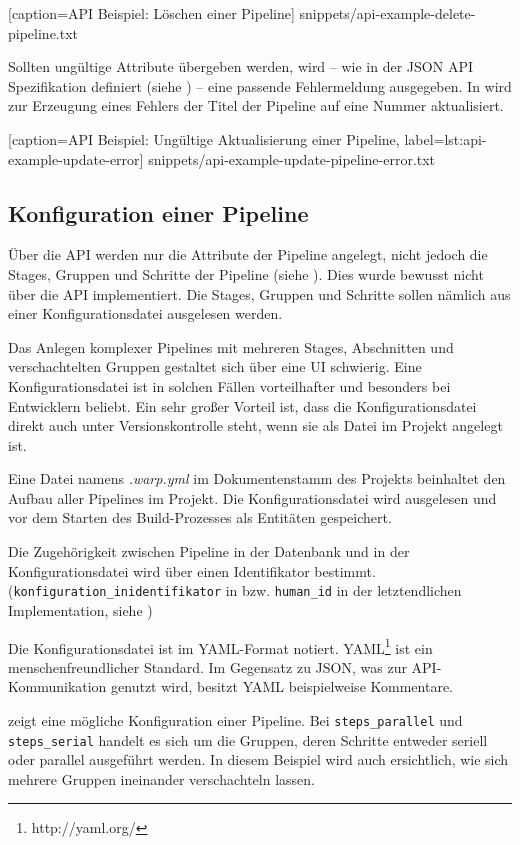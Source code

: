 
  [caption={API Beispiel: Löschen einer Pipeline}]
  {snippets/api-example-delete-pipeline.txt}

Sollten ungültige Attribute übergeben werden, wird – wie in der JSON API Spezifikation definiert (siehe ) – eine passende Fehlermeldung ausgegeben. In  wird zur Erzeugung eines Fehlers der Titel der Pipeline auf eine Nummer aktualisiert.


  [caption={API Beispiel: Ungültige Aktualisierung einer Pipeline},
  label={lst:api-example-update-error}]
  {snippets/api-example-update-pipeline-error.txt}


\subsection{Konfiguration einer Pipeline}

Über die API werden nur die Attribute der Pipeline angelegt, nicht jedoch die Stages, Gruppen und Schritte der Pipeline (siehe ). Dies wurde bewusst nicht über die API implementiert. Die Stages, Gruppen und Schritte sollen nämlich aus einer Konfigurationsdatei ausgelesen werden.

Das Anlegen komplexer Pipelines mit mehreren Stages, Abschnitten und verschachtelten Gruppen gestaltet sich über eine UI schwierig. Eine Konfigurationsdatei ist in solchen Fällen vorteilhafter und besonders bei Entwicklern beliebt. Ein sehr großer Vorteil ist, dass die Konfigurationsdatei direkt auch unter Versionskontrolle steht, wenn sie als Datei im Projekt angelegt ist.

Eine Datei namens \emph{.warp.yml} im Dokumentenstamm des Projekts beinhaltet den Aufbau aller Pipelines im Projekt. Die Konfigurationsdatei wird ausgelesen und vor dem Starten des Build-Prozesses als Entitäten gespeichert.

Die Zugehörigkeit zwischen Pipeline in der Datenbank und in der Konfigurationsdatei wird über einen Identifikator bestimmt. (\texttt{konfiguration\_\allowbreak inidentifikator} in  bzw. \texttt{human\_id} in der letztendlichen Implementation, siehe )

Die Konfigurationsdatei ist im YAML-Format notiert. YAML\footnote{http://yaml.org/} ist ein menschenfreundlicher Standard. Im Gegensatz zu JSON, was zur API-Kommunikation genutzt wird, besitzt YAML beispielweise Kommentare.

 zeigt eine mögliche Konfiguration einer Pipeline. Bei \texttt{steps\_\allowbreak parallel} und \texttt{steps\_\allowbreak serial} handelt es sich um die Gruppen, deren Schritte entweder seriell oder parallel ausgeführt werden. In diesem Beispiel wird auch ersichtlich, wie sich mehrere Gruppen ineinander verschachteln lassen.


